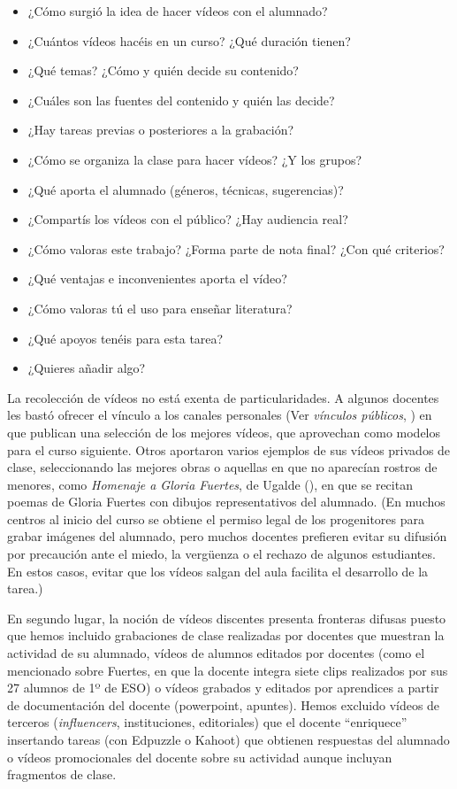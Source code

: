\documentclass[spanish]{textolivre}
\begin{document}
\begin{itemize}
 \item ¿Cómo surgió la idea de hacer vídeos con el alumnado?
 \item ¿Cuántos vídeos hacéis en un curso? ¿Qué duración tienen?
 \item ¿Qué temas? ¿Cómo y quién decide su contenido?
 \item ¿Cuáles son las fuentes del contenido y quién las decide?
 \item ¿Hay tareas previas o posteriores a la grabación?
 \item ¿Cómo se organiza la clase para hacer vídeos? ¿Y los grupos?
 \item ¿Qué aporta el alumnado (géneros, técnicas, sugerencias)?
 \item ¿Compartís los vídeos con el público? ¿Hay audiencia real?
 \item ¿Cómo valoras este trabajo? ¿Forma parte de nota final? ¿Con qué criterios?
 \item ¿Qué ventajas e inconvenientes aporta el vídeo?
 \item ¿Cómo valoras tú el uso para enseñar literatura?
 \item ¿Qué apoyos tenéis para esta tarea?
 \item ¿Quieres añadir algo?
\end{itemize}

La recolección de vídeos no está exenta de particularidades. A algunos docentes les bastó ofrecer el vínculo a los canales personales (Ver \textit{vínculos públicos}, ) en que publican una selección de los mejores vídeos, que aprovechan como modelos para el curso siguiente. Otros aportaron varios ejemplos de sus vídeos privados de clase, seleccionando las mejores obras o aquellas en que no aparecían rostros de menores, como \textit{Homenaje a Gloria Fuertes}, de Ugalde (), en que se recitan poemas de Gloria Fuertes con dibujos representativos del alumnado. (En muchos centros al inicio del curso se obtiene el permiso legal de los progenitores para grabar imágenes del alumnado, pero muchos docentes prefieren evitar su difusión por precaución ante el miedo, la vergüenza o el rechazo de algunos estudiantes. En estos casos, evitar que los vídeos salgan del aula facilita el desarrollo de la tarea.)

En segundo lugar, la noción de vídeos discentes presenta fronteras difusas puesto que hemos incluido grabaciones de clase realizadas por docentes que muestran la actividad de su alumnado, vídeos de alumnos editados por docentes (como el mencionado sobre Fuertes, en que la docente integra siete clips realizados por sus 27 alumnos de 1º de ESO) o vídeos grabados y editados por aprendices a partir de documentación del docente (powerpoint, apuntes). Hemos excluido vídeos de terceros (\textit{influencers}, instituciones, editoriales) que el docente “enriquece” insertando tareas (con Edpuzzle o Kahoot) que obtienen respuestas del alumnado o vídeos promocionales del docente sobre su actividad aunque incluyan fragmentos de clase.
\end{document}
